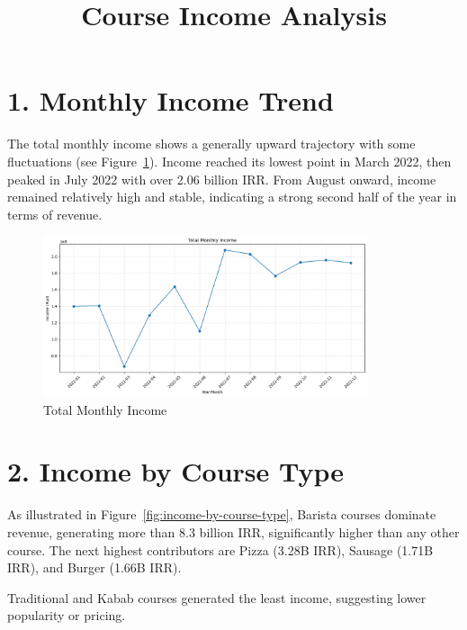 \documentclass[12pt,a4paper]{article}
\title{Course Income Analysis}
\date{}
\begin{document}
\maketitle

\section*{1. Monthly Income Trend}

The total monthly income shows a generally upward trajectory with some fluctuations (see Figure~\ref{fig:monthly-income}). Income reached its lowest point in March 2022, then peaked in July 2022 with over 2.06 billion IRR. From August onward, income remained relatively high and stable, indicating a strong second half of the year in terms of revenue.

\begin{figure}[h!]
    \centering
    \includegraphics[width=0.85\textwidth]{Total Monthly Income.png}
    \caption{Total Monthly Income}
    \label{fig:monthly-income}
\end{figure}

\section*{2. Income by Course Type}

As illustrated in Figure~\ref{fig:income-by-course-type}, Barista courses dominate revenue, generating more than 8.3 billion IRR, significantly higher than any other course. The next highest contributors are Pizza (3.28B IRR), Sausage (1.71B IRR), and Burger (1.66B IRR).

Traditional and Kabab courses generated the least income, suggesting lower popularity or pricing.
\end{document}
